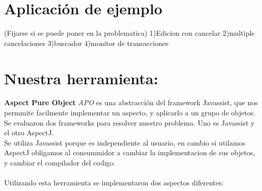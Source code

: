 \section{Aplicación de ejemplo}
(Fijarse si se puede poner en la problematica)
1)Edicion con cancelar
2)multiple cancelaciones
3)buscador
4)monitor de transacciones


\section{Nuestra herramienta: }
{\bf Aspect Pure Object } \emph{APO} es una abstracción del framework Javassist,
que nos permmite facilmente implementar un aspecto, y aplicarlo a un grupo de
objetos.
\\
Se evaluaron dos frameworks para resolver nuestro problema. Uno es Javassist y
el otro AspectJ. \cite{KiczalesHHKPG01}\\
Se utiliza Javassist porque es independiente al usuario, en cambio si utilamos
AspectJ obligamos al consummidor a cambiar la implementacion de sus objetos,
y cambiar el compilador del codigo. \\ \\ 

Utilizando esta herramienta se implementaron dos aspectos diferentes:

